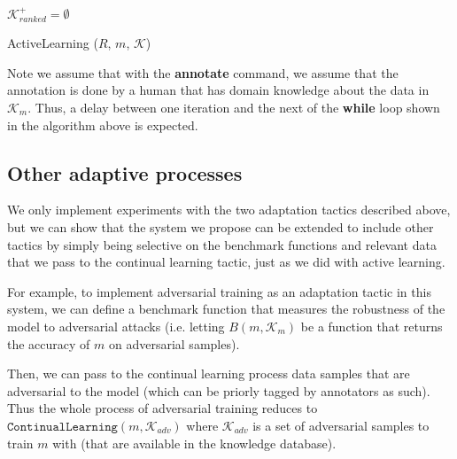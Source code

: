 \documentclass[../main.tex]{subfiles}
\begin{document}
\begin{algorithm}[H]
{        }
        $\mathcal{K}_{ranked}^+ = \emptyset$ \\
        \caption{ActiveLearning ($R$, $m$, $\mathcal{K}$)}
        \label{alg:active_learning}
    \end{algorithm}

    Note we assume that with the \textbf{annotate} command, we assume that the annotation is done by a human that has domain knowledge about the data in $\mathcal{K}_m$. Thus, a delay between one iteration and the next of the \textbf{while} loop shown in the algorithm above is expected. 

    \subsection{Other adaptive processes}

    We only implement experiments with the two adaptation tactics described above, but we can show that the system we propose can be extended to include other tactics by simply being selective on the benchmark functions and relevant data that we pass to the continual learning tactic, just as we did with active learning.

    For example, to implement adversarial training as an adaptation tactic in this system, we can define a benchmark function that measures the robustness of the model to adversarial attacks (i.e. letting $B(m, \mathcal{K}_m)$ be a function that returns the accuracy of $m$ on adversarial samples). 
    
    Then, we can pass to the continual learning process data samples that are adversarial to the model (which can be priorly tagged by annotators as such). Thus the whole process of adversarial training reduces to $\texttt{ContinualLearning}(m, \mathcal{K}_{adv})$ where $\mathcal{K}_{adv}$ is a set of adversarial samples to train $m$ with (that are available in the knowledge database).
\end{document}
